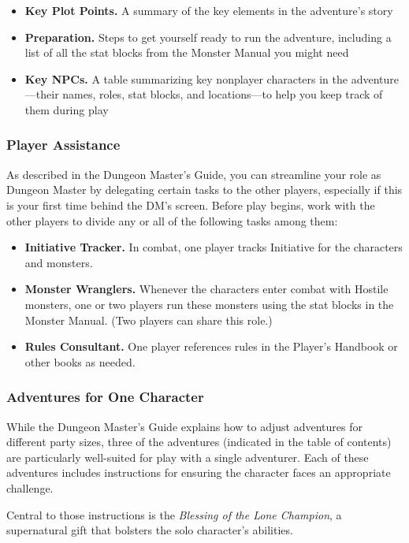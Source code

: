 \documentclass[letterpaper, 11pt, twocolumn]{dndbook}
\begin{document}
\begin{itemize}
\item \textbf{Key Plot Points.} A summary of the key elements in the adventure's story
\item \textbf{Preparation.} Steps to get yourself ready to run the adventure, including a list of all the stat blocks from the Monster Manual you might need
\item \textbf{Key NPCs.} A table summarizing key nonplayer characters in the adventure---their names, roles, stat blocks, and locations---to help you keep track of them during play
\end{itemize}

\subsubsection{Player Assistance}

As described in the Dungeon Master's Guide, you can streamline your role as Dungeon Master by delegating certain tasks to the other players, especially if this is your first time behind the DM's screen. Before play begins, work with the other players to divide any or all of the following tasks among them:

\begin{itemize}
\item \textbf{Initiative Tracker.} In combat, one player tracks Initiative for the characters and monsters.
\item \textbf{Monster Wranglers.} Whenever the characters enter combat with Hostile monsters, one or two players run these monsters using the stat blocks in the Monster Manual. (Two players can share this role.)
\item \textbf{Rules Consultant.} One player references rules in the Player's Handbook or other books as needed.
\end{itemize}

\subsubsection{Adventures for One Character}

While the Dungeon Master's Guide explains how to adjust adventures for different party sizes, three of the adventures (indicated in the table of contents) are particularly well-suited for play with a single adventurer. Each of these adventures includes instructions for ensuring the character faces an appropriate challenge.

Central to those instructions is the \textit{Blessing of the Lone Champion}, a supernatural gift that bolsters the solo character's abilities.
\end{document}
